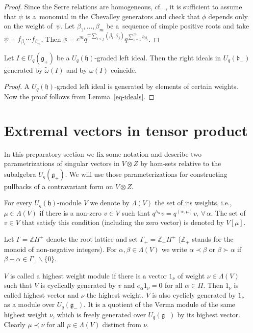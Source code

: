 \begin{proof} Since the Serre relations are homogeneous, cf.~\cite{ChP}, it is sufficient to assume that $\psi$ is a~monomial in the Chevalley generators and check that $\phi$ depends only on the weight of~$\psi$. Let $\beta_1,\ldots, \beta_m$ be a~sequence of simple positive roots and take $\psi=f_{\beta_1}\cdots f_{\beta_{m}}$. Then $\phi=c^m q^{\mp \sum_{i<j}(\beta_i,\beta_j)}q^{\sum_{i=1}^{m}h_{\beta_i}}$.
\end{proof}
\begin{Corollary}\label{inv-ideals}Let $I\in U_q(\mathfrak{g}_+)$ be a $U_q(\mathfrak{h})$-graded left ideal. Then the right ideals in $U_q(\mathfrak{b}_-)$ generated by $\tilde \omega(I)$ and by $\omega(I)$ coincide.
\end{Corollary}
\begin{proof} A $U_q(\mathfrak{h})$-graded left ideal is generated by elements of certain weights. Now the proof follows from Lemma~\ref{eq-ideals}.
\end{proof}

\section{Extremal vectors in tensor product}
In this preparatory section we fix some notation and describe two parametrizations of singular vectors in $V\otimes Z$ by hom-sets relative to the subalgebra $U_q(\mathfrak{g}_+)$. We will use those parameterizations for constructing pullbacks of a contravariant form on $V\otimes Z$.

For every $U_q(\mathfrak{h})$-module $V$ we denote by $\Lambda(V)$ the set of its weights, i.e., $\mu\in \Lambda(V)$ if there is a non-zero $v\in V$ such that $q^{h_{\alpha}}v=q^{(\alpha,\mu)}v$, $\forall\, \alpha$. The set of $v\in V$ that satisfy this condition (including the zero vector) is denoted by $V[\mu]$.

Let $\Gamma=\mathbb{Z}\Pi^+$ denote the root lattice and set $\Gamma_+=\mathbb{Z}_+\Pi^+$ ($\mathbb{Z}_+$ stands for the monoid of non-negative integers). For $\alpha,\beta \in \Lambda(V)$ we write $\alpha\prec \beta$ or $\beta \succ \alpha$ if $\beta-\alpha \in \Gamma_+\backslash \{0\}$.

$V$ is called a highest weight module if there is a vector $1_\nu$ of weight $\nu\in \Lambda(V)$ such that $V$ is cyclically generated by $v$ and $e_\alpha 1_\nu=0$ for all $\alpha \in \Pi$. Then $1_\nu$ is called highest vector and $\nu$ the highest weight. $V$ is also cyclicly generated by $1_\nu$ as a module over $U_q(\mathfrak{g}_-)$. It is a quotient of the Verma module of the same highest weight $\nu$, which is freely generated over $U_q(\mathfrak{g}_-)$ by its highest vector. Clearly $\mu\prec \nu$ for all $\mu\in \Lambda(V)$ distinct from $\nu$.

